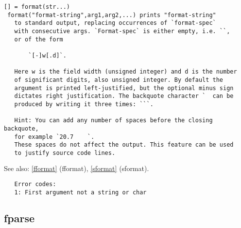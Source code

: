 \documentclass[a4paper]{article}
\begin{document}
\begin{tscreen}
\begin{verbatim}
[] = format(str...)
 format("format-string",arg1,arg2,...) prints "format-string"
   to standard output, replacing occurrences of `format-spec`
   with consecutive args. `Format-spec` is either empty, i.e. ``,
   or of the form

       `[-]w[.d]`.

   Here w is the field width (unsigned integer) and d is the number
   of significant digits, also unsigned integer. By default the
   argument is printed left-justified, but the optional minus sign
   dictates right justification. The backquote character `  can be
   produced by writing it three times: ```.
   
   Hint: You can add any number of spaces before the closing backquote,
   for example `20.7    `.
   These spaces do not affect the output. This feature can be used
   to justify source code lines.
\end{verbatim}

See also: \ref{fformat} {(fformat)}, \ref{sformat} {(sformat)}.
\begin{verbatim}
   Error codes:
   1: First argument not a string or char 
\end{verbatim}
\end{tscreen}



\subsection{fparse\label{fparse}}
\end{document}
